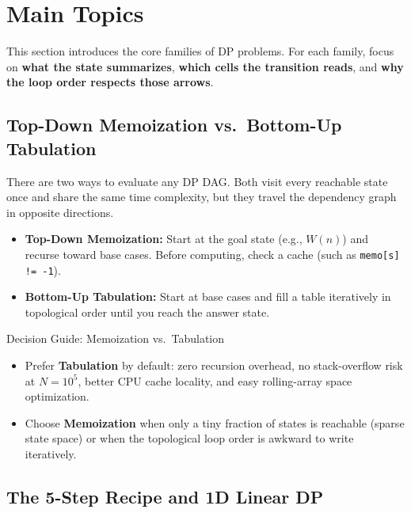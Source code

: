 \documentclass[11pt,a4paper]{article}
\theoremstyle{definition}
\begin{document}
\section{Main Topics}

This section introduces the core families of DP problems. For each family, focus on \textbf{what the state summarizes}, \textbf{which cells the transition reads}, and \textbf{why the loop order respects those arrows}.

\subsection{Top-Down Memoization vs.\ Bottom-Up Tabulation}

There are two ways to evaluate any DP DAG. Both visit every reachable state once and share the same time complexity, but they travel the dependency graph in opposite directions.

\begin{itemize}
    \item \textbf{Top-Down Memoization:} Start at the goal state (e.g., $W(n)$) and recurse toward base cases. Before computing, check a cache (such as \texttt{memo[s] != -1}).
    \item \textbf{Bottom-Up Tabulation:} Start at base cases and fill a table iteratively in topological order until you reach the answer state.
\end{itemize}

\begin{calloutbox}{Decision Guide: Memoization vs.\ Tabulation}
\begin{itemize}
    \item Prefer \textbf{Tabulation} by default: zero recursion overhead, no stack-overflow risk at $N = 10^5$, better CPU cache locality, and easy rolling-array space optimization.
    \item Choose \textbf{Memoization} when only a tiny fraction of states is reachable (sparse state space) or when the topological loop order is awkward to write iteratively.
\end{itemize}
\end{calloutbox}

\subsection{The 5-Step Recipe and 1D Linear DP}
\end{document}
